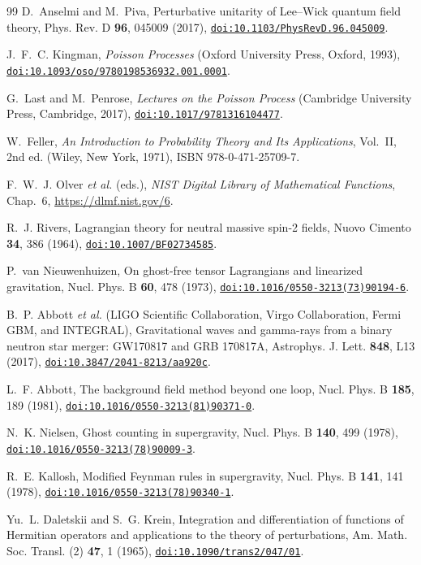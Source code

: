 \documentclass[a4paper,11pt]{article}
\newcommand{\doilink}[1]{\href{https://doi.org/#1}{\nolinkurl{doi:#1}}}
\begin{document}
\begin{thebibliography}{99}
D.~Anselmi and M.~Piva, Perturbative unitarity of Lee--Wick quantum field theory, Phys. Rev. D \textbf{96}, 045009 (2017), \doilink{10.1103/PhysRevD.96.045009}.

J.~F.~C. Kingman, \emph{Poisson Processes} (Oxford University Press, Oxford, 1993), \doilink{10.1093/oso/9780198536932.001.0001}.

G.~Last and M.~Penrose, \emph{Lectures on the Poisson Process} (Cambridge University Press, Cambridge, 2017), \doilink{10.1017/9781316104477}.

W.~Feller, \emph{An Introduction to Probability Theory and Its Applications}, Vol.~II, 2nd ed. (Wiley, New York, 1971), ISBN 978-0-471-25709-7.

F.~W.~J. Olver \emph{et al.} (eds.), \emph{NIST Digital Library of Mathematical Functions}, Chap.~6, \url{https://dlmf.nist.gov/6}.

R.~J. Rivers, Lagrangian theory for neutral massive spin-2 fields, Nuovo Cimento \textbf{34}, 386 (1964), \doilink{10.1007/BF02734585}.

P.~van Nieuwenhuizen, On ghost-free tensor Lagrangians and linearized gravitation, Nucl. Phys. B \textbf{60}, 478 (1973), \doilink{10.1016/0550-3213(73)90194-6}.

B.~P. Abbott \emph{et al.} (LIGO Scientific Collaboration, Virgo Collaboration, Fermi GBM, and INTEGRAL), Gravitational waves and gamma-rays from a binary neutron star merger: GW170817 and GRB 170817A, Astrophys. J. Lett. \textbf{848}, L13 (2017), \doilink{10.3847/2041-8213/aa920c}.

L.~F. Abbott, The background field method beyond one loop, Nucl. Phys. B \textbf{185}, 189 (1981), \doilink{10.1016/0550-3213(81)90371-0}.

N.~K. Nielsen, Ghost counting in supergravity, Nucl. Phys. B \textbf{140}, 499 (1978), \doilink{10.1016/0550-3213(78)90009-3}.

R.~E. Kallosh, Modified Feynman rules in supergravity, Nucl. Phys. B \textbf{141}, 141 (1978), \doilink{10.1016/0550-3213(78)90340-1}.

Yu.~L. Daletskii and S.~G. Krein, Integration and differentiation of functions of Hermitian operators and applications to the theory of perturbations, Am. Math. Soc. Transl. (2) \textbf{47}, 1 (1965), \doilink{10.1090/trans2/047/01}.


\end{thebibliography}
\end{document}
